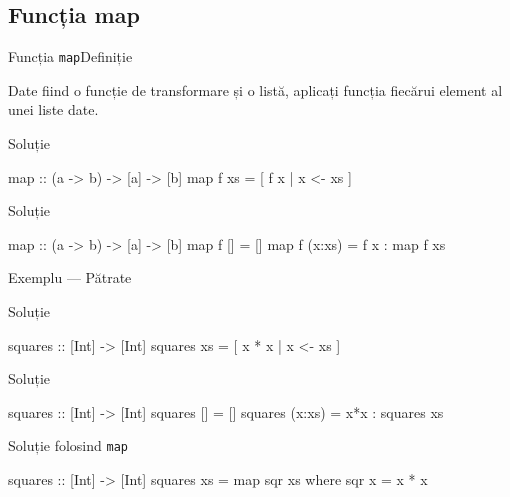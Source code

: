 \documentclass[handout,xcolor=pdftex,romanian,colorlinks]{beamer}
\begin{document}
\subsection{Funcția map}

\begin{frame}[fragile]{Funcția \lstinline$map$}{Definiție}
\begin{block}{}
Date fiind o funcție de transformare și o listă, aplicați funcția fiecărui element al unei liste date.
\end{block}
\begin{block}{Soluție }
\begin{asciihs}
map :: (a -> b) -> [a] -> [b]
map f xs = [ f x | x <- xs ]
\end{asciihs}
\end{block}
\begin{block}{Soluție }
\begin{asciihs}
map :: (a -> b) -> [a] -> [b]
map f []     = []
map f (x:xs) = f x : map f xs
\end{asciihs}
\end{block}
\end{frame}


\begin{frame}[fragile]{Exemplu --- Pătrate}
\begin{block}{Soluție }
\begin{asciihs}
squares :: [Int] -> [Int]
squares xs = [ x * x | x <- xs ]
\end{asciihs}
\end{block}
\begin{block}{Soluție }
\begin{asciihs}
squares :: [Int] -> [Int]
squares []     = []
squares (x:xs) = x*x : squares xs
\end{asciihs}
\end{block}
\begin{block}{Soluție folosind \lstinline$map$}
\begin{asciihs}
squares :: [Int] -> [Int]
squares xs = map sqr xs
  where sqr x = x * x
\end{asciihs}
\end{block}
\end{frame}
\end{document}
